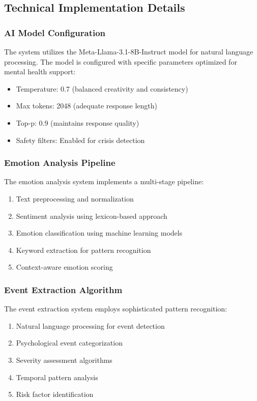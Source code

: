\subsection{Technical Implementation Details}

\subsubsection{AI Model Configuration}

The system utilizes the Meta-Llama-3.1-8B-Instruct model for natural language processing. The model is configured with specific parameters optimized for mental health support:

\begin{itemize}
    \item Temperature: 0.7 (balanced creativity and consistency)
    \item Max tokens: 2048 (adequate response length)
    \item Top-p: 0.9 (maintains response quality)
    \item Safety filters: Enabled for crisis detection
\end{itemize}

\subsubsection{Emotion Analysis Pipeline}

The emotion analysis system implements a multi-stage pipeline:

\begin{enumerate}
    \item Text preprocessing and normalization
    \item Sentiment analysis using lexicon-based approach
    \item Emotion classification using machine learning models
    \item Keyword extraction for pattern recognition
    \item Context-aware emotion scoring
\end{enumerate}

\subsubsection{Event Extraction Algorithm}

The event extraction system employs sophisticated pattern recognition:

\begin{enumerate}
    \item Natural language processing for event detection
    \item Psychological event categorization
    \item Severity assessment algorithms
    \item Temporal pattern analysis
    \item Risk factor identification
\end{enumerate}

